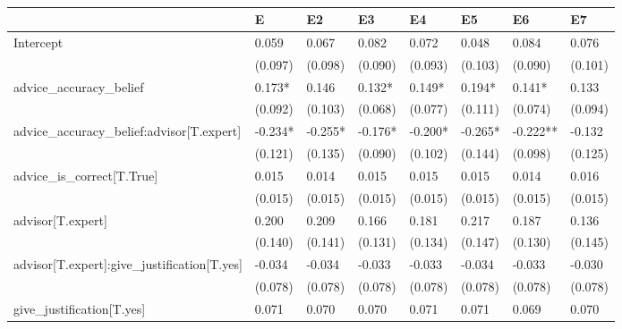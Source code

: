 \begin{table}
\caption{}
\label{}
\begin{center}
\begin{tabular}{llllllll}
\hline
                                                    & E        & E2       & E3       & E4       & E5       & E6       & E7        \\
\hline
Intercept                                           & 0.059    & 0.067    & 0.082    & 0.072    & 0.048    & 0.084    & 0.076     \\
                                                    & (0.097)  & (0.098)  & (0.090)  & (0.093)  & (0.103)  & (0.090)  & (0.101)   \\
advice\_accuracy\_belief                            & 0.173*   & 0.146    & 0.132*   & 0.149*   & 0.194*   & 0.141*   & 0.133     \\
                                                    & (0.092)  & (0.103)  & (0.068)  & (0.077)  & (0.111)  & (0.074)  & (0.094)   \\
advice\_accuracy\_belief:advisor[T.expert]          & -0.234*  & -0.255*  & -0.176*  & -0.200*  & -0.265*  & -0.222** & -0.132    \\
                                                    & (0.121)  & (0.135)  & (0.090)  & (0.102)  & (0.144)  & (0.098)  & (0.125)   \\
advice\_is\_correct[T.True]                         & 0.015    & 0.014    & 0.015    & 0.015    & 0.015    & 0.014    & 0.016     \\
                                                    & (0.015)  & (0.015)  & (0.015)  & (0.015)  & (0.015)  & (0.015)  & (0.015)   \\
advisor[T.expert]                                   & 0.200    & 0.209    & 0.166    & 0.181    & 0.217    & 0.187    & 0.136     \\
                                                    & (0.140)  & (0.141)  & (0.131)  & (0.134)  & (0.147)  & (0.130)  & (0.145)   \\
advisor[T.expert]:give\_justification[T.yes]        & -0.034   & -0.034   & -0.033   & -0.033   & -0.034   & -0.033   & -0.030    \\
                                                    & (0.078)  & (0.078)  & (0.078)  & (0.078)  & (0.078)  & (0.078)  & (0.078)   \\
give\_justification[T.yes]                          & 0.071    & 0.070    & 0.070    & 0.071    & 0.071    & 0.069    & 0.070     \\

\end{tabular}
\end{center}
\end{table}
